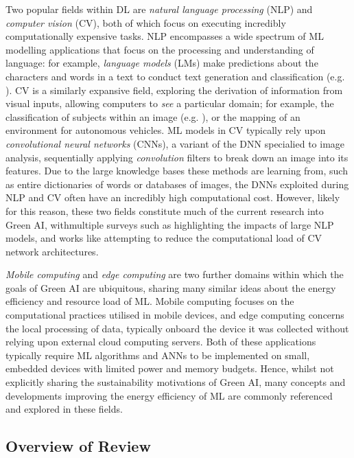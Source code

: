\documentclass[a4paper, 12pt]{article}
\begin{document}
    Two popular fields within DL are \emph{natural language processing} (NLP) and \emph{computer vision} (CV), both of which focus on executing incredibly computationally expensive tasks. NLP encompasses a wide spectrum of ML modelling applications that focus on the processing and understanding of language: for example, \emph{language models} (LMs) make predictions about the characters and words in a text to conduct text generation and classification (e.g. ). CV is a similarly expansive field, exploring the derivation of information from visual inputs, allowing computers to \emph{see} a particular domain; for example, the classification of subjects within an image (e.g. ), or the mapping of an environment for autonomous vehicles. ML models in CV typically rely upon \emph{convolutional neural networks} (CNNs), a variant of the DNN specialied to image analysis, sequentially applying \emph{convolution} filters to break down an image into its features. Due to the large knowledge bases these methods are learning from, such as entire dictionaries of words or databases of images, the DNNs exploited during NLP and CV often have an incredibly high computational cost. However, likely for this reason, these two fields constitute much of the current research into Green AI, withmultiple surveys such as  highlighting the impacts of large NLP models, and works like  attempting to reduce the computational load of CV network architectures. 
    
    \emph{Mobile computing} and \emph{edge computing} are two further domains within which the goals of Green AI are ubiquitous, sharing many similar ideas about the energy efficiency and resource load of ML. Mobile computing focuses on the computational practices utilised in mobile devices, and edge computing concerns the local processing of data, typically onboard the device it was collected without relying upon external cloud computing servers. Both of these applications typically require ML algorithms and ANNs to be implemented on small, embedded devices with limited power and memory budgets. Hence, whilst not explicitly sharing the sustainability motivations of Green AI, many concepts and developments improving the energy efficiency of ML are commonly referenced and explored in these fields.

    \subsection{Overview of Review}
\end{document}
